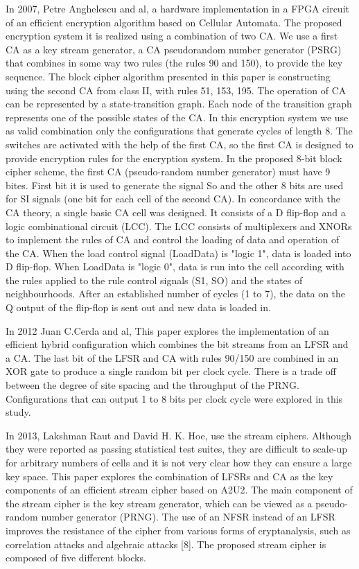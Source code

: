 In 2007, Petre Anghelescu and al, a hardware implementation in a FPGA circuit of an efficient encryption algorithm based on Cellular Automata. The proposed encryption system it is realized using a combination of two CA. We use a first CA as a key stream generator, a CA pseudorandom number generator (PSRG) that combines in some way two rules (the rules 90 and 150), to provide the key sequence. The block cipher algorithm presented in this
paper is constructing using the second CA from class II, with rules 51, 153, 195. The operation of CA can be represented by a state-transition graph. Each node of the transition graph represents one of the possible states of the CA. In this encryption system we use as valid combination only the configurations that generate cycles of length 8. The switches are activated with the help of the first CA, so the first CA is designed to provide encryption rules for the encryption system. In the proposed 8-bit block cipher scheme, the first CA (pseudo-random number generator) must have 9 bites. First bit it is used to generate the signal So and the other 8 bits are used for SI signals (one bit for each cell of the second CA). In concordance with the CA theory, a single basic CA cell was designed. It consists of a D flip-flop and a logic combinational circuit (LCC). The LCC consists of multiplexers and XNORs to implement the rules of CA and control the loading of data and operation of the CA. When the load control signal (LoadData) is "logic 1", data is loaded into D flip-flop. When LoadData is "logic 0", data is run into the cell according with the rules applied to the rule control signals (S1, SO) and the states of neighbourhoods. After an established number of cycles (1 to 7), the data on the Q output of the flip-flop is sent out and new data is loaded in.

In 2012 Juan C.Cerda and al, This paper explores the implementation of an efficient hybrid configuration which combines the bit streams from an LFSR and a CA.  The last bit of the LFSR and CA with rules 90/150 are combined in an XOR gate to produce a single random bit per clock cycle. There is a trade off between the degree of site spacing and the throughput of the PRNG. Configurations that can output 1 to 8 bits per clock cycle were explored in this study.

In 2013, Lakshman Raut and David H. K. Hoe, use the stream ciphers. Although they were reported as passing statistical test suites, they are difficult to scale-up for arbitrary numbers of cells and it is not very clear how they can ensure a large key space. This paper explores the combination of LFSRs and CA as the key components of an efficient stream cipher based on A2U2. The main component of the stream cipher is the key stream generator, which can be viewed as a pseudo-random number generator (PRNG). The use of an NFSR instead of an LFSR improves the resistance of the cipher from various forms of cryptanalysis, such as correlation attacks and algebraic attacks [8]. The proposed stream cipher is composed of five different blocks.

